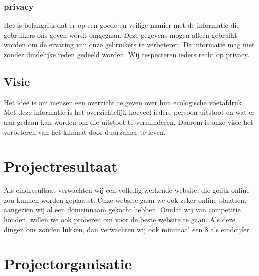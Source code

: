 \documentclass{uva-inf-article}
\begin{document}
\subsubsection{privacy}
Het is belangrijk dat er op een goede en veilige manier met de informatie die gebruikers ons geven wordt omgegaan. Deze gegevens mogen alleen gebruikt worden om de ervaring van onze gebruikers te verbeteren. De informatie mag niet zonder duidelijke reden gedeeld worden. Wij respecteren ieders recht op privacy.


\subsection{Visie}
Het idee is om mensen een overzicht te geven over hun ecologische voetafdruk. Met deze informatie is het overzichtelijk hoeveel iedere persoon uitstoot en wat er aan gedaan kan worden om die uitstoot te verminderen. Daarom is onze visie het verbeteren van het klimaat door duurzamer te leven.


\section{Projectresultaat}
Als eindresultaat verwachten wij een volledig werkende website, die gelijk online zou kunnen worden geplaatst. Onze website gaan we ook zeker online plaatsen, aangezien wij al een domeinnaam gekocht hebben. Omdat wij van competitie houden, willen we ook proberen om voor de beste website te gaan. Als deze dingen ons zouden lukken, dan verwachten wij ook minimaal een 8 als eindcijfer. 


\section{Projectorganisatie}
\end{document}
